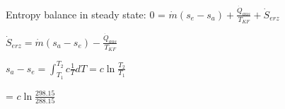 Entropy balance in steady state:  
0 = \( \dot{m} (s_e - s_a) + \frac{\dot{Q}_{aus}}{T_{KF}} + \dot{S}_{erz} \)  

\( \dot{S}_{erz} = \dot{m} (s_a - s_e) - \frac{\dot{Q}_{aus}}{T_{KF}} \)  

\( s_a - s_e = \int_{T_1}^{T_2} c \frac{1}{T} dT = c \ln \frac{T_2}{T_1} \)  

= \( c \ln \frac{298.15}{288.15} \)